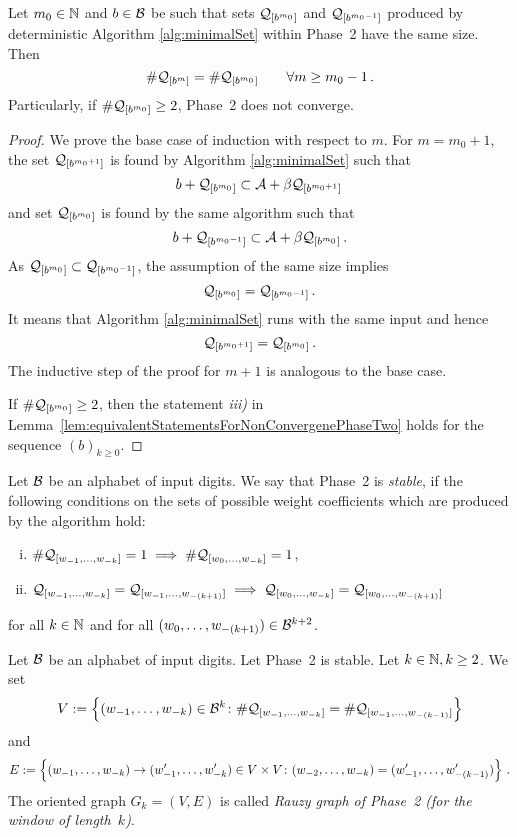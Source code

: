 \begin{thm}
\label{thm:bbbCondition}
Let $m_0 \in \NN$ and $b\in\B$ be such that sets $\Qb{m_0}$ and $\Qb{m_0-1}$ produced by deterministic Algorithm \ref{alg:minimalSet} within Phase~2 have the same size. Then
$$
    \#\Qb{m} = \#\Qb{m_0} \qquad \forall m\geq m_0-1\,.
$$ 
Particularly, if $\#\Qb{m_0}\geq 2$, Phase~2 does not converge.
\end{thm}
\begin{proof}
We prove the base case of induction with respect to $m$. For $m=m_0+1$, the set $\Qb{m_0+1}$ is found by Algorithm \ref{alg:minimalSet} such that 
$$
b + \Qb{m_0} \subset \A + \beta \Qb{m_0+1}\,
$$
and set $\Qb{m_0}$ is found by the same algorithm such that
$$
b + \Qb{m_0-1} \subset \A + \beta \Qb{m_0}\,.
$$
As $\Qb{m_0} \subset \Qb{m_0-1}$, the assumption of the same size implies
$$
    \Qb{m_0} = \Qb{m_0-1}\,.
$$
It means that Algorithm \ref{alg:minimalSet} runs with the same input and hence
$$
\Qb{m_0+1}=\Qb{m_0}\,.
$$
The inductive step of the proof for $m+1$ is analogous to the base case.

If $\#\Qb{m_0}\geq 2$, then the statement \textit{iii)} in Lemma~\ref{lem:equivalentStatementsForNonConvergenePhaseTwo} holds for the sequence $(b)_{k\geq 0}$.
\end{proof}





\begin{defn}
Let $\B$ be an alphabet of input digits. We say that Phase~2 is \emph{stable}, if the following conditions on the sets of possible weight coefficients which are produced by the algorithm hold: 
\begin{enumerate}[i)]
	\item $\#\Qw{1}{k}=1 \implies \#\Qwo{k}=1$,
	\item $\Qw{1}{k}=\Qw{1}{(k+1)} \implies \Qwo{k}=\Qwo{(k+1)}$
\end{enumerate}
for all $k\in\NN$ and for all $\tupleo{(k+1)} \in \B^{k+2}$.
\end{defn}


\begin{defn}
Let $\B$ be an alphabet of input digits. Let Phase~2 is stable. Let $k\in\NN, k\geq 2$. We set
$$
V:=\left\{\tuple{1}{k}\in\B^k \colon \#\Qw{1}{k}=\#\Qw{1}{(k-1)}\right\}
$$
and
$$
E:=\left\{\tuple{1}{k}\rightarrow\tuple[w']{1}{k}\in V\times V \colon \tuple{2}{k}=\tuple[w']{1}{(k-1)}\right\}\,.
$$
The oriented graph $G_k=(V,E)$ is called \emph{Rauzy graph of Phase~2 (for the window of length~$k$)}.
\end{defn}

